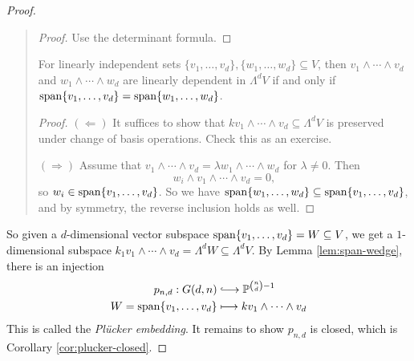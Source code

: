 \begin{proof}
\begin{quote}
    \begin{proof}
      Use the determinant formula.
    \end{proof}

    \begin{lemma}\label{lem:span-wedge}
      For linearly independent
      sets $\{v_1, \dots, v_d\}, \{w_1, \dots, w_d\} \subseteq V$,
      then $v_1 \wedge \cdots \wedge v_d$
      and $w_1 \wedge \cdots \wedge w_d$
      are linearly dependent in
      $\Lambda^d V$ if and only if
      $\operatorname{span}\{v_1, \dots, v_d\} = \operatorname{span}\{w_1, \dots, w_d\}$.
    \end{lemma}

    \begin{proof}
      $(\Leftarrow)$ It suffices to show
      that $k v_1 \wedge \cdots \wedge v_d \subseteq \Lambda^d V$
      is preserved under change of basis operations.
      Check this as an exercise.

      $(\Rightarrow)$
      Assume that
      $v_1 \wedge \cdots \wedge v_d = \lambda w_1 \wedge \cdots \wedge w_d$
      for $\lambda \ne 0$.
      Then
      \[
        w_i \wedge v_1 \wedge \cdots \wedge v_d = 0,
      \]
      so $w_i \in \operatorname{span}\{v_1, \dots, v_d\}$.
      So we have
      $\operatorname{span}\{w_1, \dots, w_d\} \subseteq
      \operatorname{span}\{v_1, \dots, v_d\}$,
      and by symmetry, the reverse inclusion
      holds as well.
    \end{proof}
  \end{quote}
  So given a $d$-dimensional vector subspace
  $\operatorname{span}\{v_1, \dots, v_d\} = W \subseteq V$,
  we get a $1$-dimensional subspace
  $k_1 v_1 \wedge \cdots \wedge v_d = \Lambda^d W \subseteq \Lambda^d V$.
  By Lemma \ref{lem:span-wedge}, there is
  an injection
  \begin{align*}
    p_{n, d} : G(d, n)
    &\lhook\joinrel\longrightarrow \PP^{\binom{n}{d} - 1} \\
    W = \Span\{v_1, \dots, v_d\}
    &\longmapsto
    k v_1 \wedge \cdots \wedge v_d
  \end{align*}
  This is called the \emph{Pl\"ucker embedding}.
  It remains to show $p_{n, d}$
  is closed, which is Corollary
  \ref{cor:plucker-closed}.
\end{proof}
